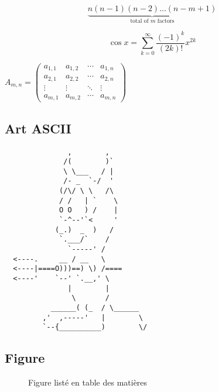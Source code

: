 $$
\underbrace{n(n-1)(n-2)\dots(n-m+1)}_
{\mbox{total of $m$ factors}}
$$

\bigskip  
  
\[\cos x=\sum_{k=0}^{\infty}\frac{(-1)^k}{(2k)!}x^{2k}\]

\bigskip 

\begin{center}
$A_{m,n} =
 \begin{pmatrix}
  a_{1,1} & a_{1,2} & \cdots & a_{1,n} \\
  a_{2,1} & a_{2,2} & \cdots & a_{2,n} \\
  \vdots  & \vdots  & \ddots & \vdots  \\
  a_{m,1} & a_{m,2} & \cdots & a_{m,n}
 \end{pmatrix}$
\end{center}

\subsection{Art ASCII}
\begin{verbatim}
               ,        ,
              /(        )`
              \ \___   / |
              /- _  `-/  '
             (/\/ \ \   /\
             / /   | `    \
             O O   ) /    |
             `-^--'`<     '
            (_.)  _  )   /
             `.___/`    /
               `-----' /
  <----.     __ / __   \
  <----|====O)))==) \) /====
  <----'    `--' `.__,' \
               |        |
                \       /
           ______( (_  / \______
         ,'  ,-----'   |        \
         `--{__________)        \/   
\end{verbatim}










\pagebreak











\subsection{Figure}
\begin{figure}[hbtp]
\caption{Figure listé en table des matières}
\centering
{}
\end{figure}

